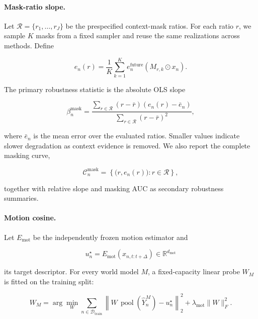 \paragraph{Mask-ratio slope.}
Let \(\mathcal R=\{r_1,\ldots,r_J\}\) be the prespecified context-mask
ratios. For each ratio \(r\), we sample \(K\) masks from a fixed sampler
and reuse the same realizations across methods. Define

\begin{equation*}
e_n(r)
=
\frac{1}{K}
\sum_{k=1}^{K}
e_n^{\mathrm{future}}
\left(
M_{r,k}\odot x_n
\right).
\end{equation*}

The primary robustness statistic is the absolute OLS slope

\begin{equation*}
\beta_n^{\mathrm{mask}}
=
\frac{
\sum_{r\in\mathcal R}
(r-\bar r)
\left(
e_n(r)-\bar e_n
\right)
}{
\sum_{r\in\mathcal R}
(r-\bar r)^2
},
\end{equation*}

where \(\bar e_n\) is the mean error over the evaluated ratios. Smaller
values indicate slower degradation as context evidence is removed. We
also report the complete masking curve,

\begin{equation*}
\mathcal C_n^{\mathrm{mask}}
=
\left\{
\bigl(r,e_n(r)\bigr):
r\in\mathcal R
\right\},
\end{equation*}

together with relative slope and masking AUC as secondary robustness
summaries.

\paragraph{Motion cosine.}
Let \(E_{\mathrm{mot}}\) be the independently frozen motion estimator
and

\begin{equation*}
u_n^\star
=
E_{\mathrm{mot}}
\left(
x_{n,t:t+\Delta}
\right)
\in\mathbb R^{d_{\mathrm{mot}}}
\end{equation*}

its target descriptor. For every world model \(M\), a fixed-capacity
linear probe \(W_M\) is fitted on the training split:

\begin{equation*}
W_M
=
\arg\min_W
\sum_{n\in\mathcal D_{\mathrm{train}}}
\left\|
W\,\operatorname{pool}
\left(
\widehat Y_n^{M}
\right)
-
u_n^\star
\right\|_2^2
+
\lambda_{\mathrm{mot}}\|W\|_F^2 .
\end{equation*}

